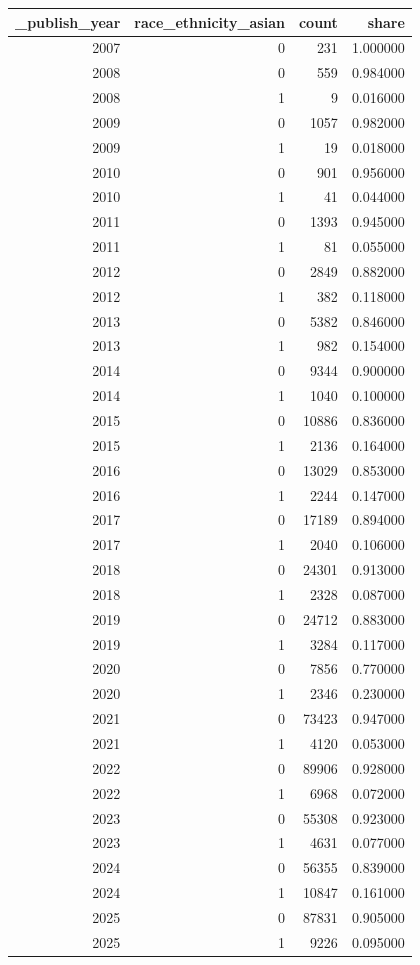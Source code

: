 \begin{tabular}{rrrr}
\toprule
_publish_year & race_ethnicity_asian & count & share \\
\midrule
2007 & 0 & 231 & 1.000000 \\
2008 & 0 & 559 & 0.984000 \\
2008 & 1 & 9 & 0.016000 \\
2009 & 0 & 1057 & 0.982000 \\
2009 & 1 & 19 & 0.018000 \\
2010 & 0 & 901 & 0.956000 \\
2010 & 1 & 41 & 0.044000 \\
2011 & 0 & 1393 & 0.945000 \\
2011 & 1 & 81 & 0.055000 \\
2012 & 0 & 2849 & 0.882000 \\
2012 & 1 & 382 & 0.118000 \\
2013 & 0 & 5382 & 0.846000 \\
2013 & 1 & 982 & 0.154000 \\
2014 & 0 & 9344 & 0.900000 \\
2014 & 1 & 1040 & 0.100000 \\
2015 & 0 & 10886 & 0.836000 \\
2015 & 1 & 2136 & 0.164000 \\
2016 & 0 & 13029 & 0.853000 \\
2016 & 1 & 2244 & 0.147000 \\
2017 & 0 & 17189 & 0.894000 \\
2017 & 1 & 2040 & 0.106000 \\
2018 & 0 & 24301 & 0.913000 \\
2018 & 1 & 2328 & 0.087000 \\
2019 & 0 & 24712 & 0.883000 \\
2019 & 1 & 3284 & 0.117000 \\
2020 & 0 & 7856 & 0.770000 \\
2020 & 1 & 2346 & 0.230000 \\
2021 & 0 & 73423 & 0.947000 \\
2021 & 1 & 4120 & 0.053000 \\
2022 & 0 & 89906 & 0.928000 \\
2022 & 1 & 6968 & 0.072000 \\
2023 & 0 & 55308 & 0.923000 \\
2023 & 1 & 4631 & 0.077000 \\
2024 & 0 & 56355 & 0.839000 \\
2024 & 1 & 10847 & 0.161000 \\
2025 & 0 & 87831 & 0.905000 \\
2025 & 1 & 9226 & 0.095000 \\
\bottomrule
\end{tabular}
